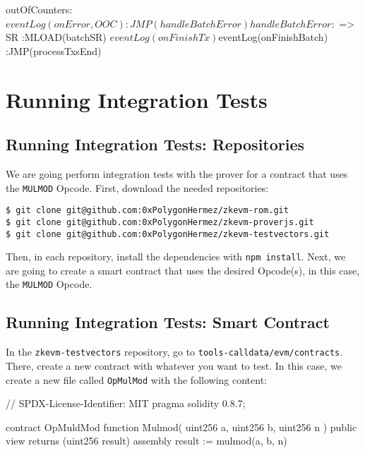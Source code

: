 \begin{zkasm}
outOfCounters:
    ${eventLog(onError, OOC)}
                    :JMP(handleBatchError)

handleBatchError:
    $ => SR         :MLOAD(batchSR)
    ${eventLog(onFinishTx)}
    ${eventLog(onFinishBatch)}
                    :JMP(processTxsEnd)
\end{zkasm}










\section{Running Integration Tests}

\subsection{Running Integration Tests: Repositories}

We are going perform integration tests with the prover for a contract
that uses the \texttt{MULMOD} Opcode. First, download the needed repositories:

\begin{lstlisting}[style=termt]
$ git clone git@github.com:0xPolygonHermez/zkevm-rom.git
$ git clone git@github.com:0xPolygonHermez/zkevm-proverjs.git
$ git clone git@github.com:0xPolygonHermez/zkevm-testvectors.git
\end{lstlisting}

 Then, in each repository, install the dependencies with \texttt{npm install}.
 Next, we are going to create a smart contract that uses the desired Opcode(s), 
in this case, the \texttt{MULMOD} Opcode.


\subsection{Running Integration Tests: Smart Contract}

 In the \texttt{zkevm-testvectors} repository, go to \texttt{tools-calldata/evm/contracts}.
 There, create a new contract with whatever you want to test.
 In this case, we create a new file called \texttt{OpMulMod} with the following content:


\begin{solidity}
// SPDX-License-Identifier: MIT
pragma solidity 0.8.7;

contract OpMuldMod {
  function Mulmod( uint256 a, uint256 b, uint256 n ) public view returns (uint256 result) {
    assembly {
      result := mulmod(a, b, n)
    }
  }
}
\end{solidity}







